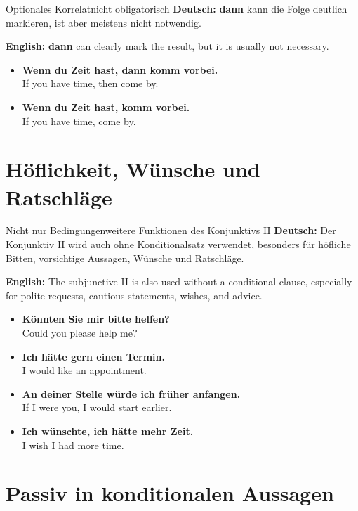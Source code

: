 \documentclass[a4paper,11pt]{article}
\newcommand{\GermanText}[1]{\textbf{Deutsch: }#1\par}
\newcommand{\EnglishText}[1]{{\small\color{SoftGray}\textbf{English: }#1\par}}
\newcommand{\ExampleItem}[2]{\item \textbf{#1}\\{\small\color{SoftGray}#2}}
\begin{document}
        \begin{grammarentry}{Optionales Korrelat}{nicht obligatorisch}
            \GermanText{\textbf{dann} kann die Folge deutlich markieren, ist aber meistens nicht notwendig.}
            \EnglishText{\textbf{dann} can clearly mark the result, but it is usually not necessary.}
        \end{grammarentry}

        \begin{exbox}
            \begin{itemize}
                \ExampleItem{Wenn du Zeit hast, dann komm vorbei.}{If you have time, then come by.}
                \ExampleItem{Wenn du Zeit hast, komm vorbei.}{If you have time, come by.}
            \end{itemize}
        \end{exbox}

    \section{Höflichkeit, Wünsche und Ratschläge}

        \begin{grammarentry}{Nicht nur Bedingungen}{weitere Funktionen des Konjunktivs II}
            \GermanText{Der Konjunktiv II wird auch ohne Konditionalsatz verwendet, besonders für höfliche Bitten, vorsichtige Aussagen, Wünsche und Ratschläge.}
            \EnglishText{The subjunctive II is also used without a conditional clause, especially for polite requests, cautious statements, wishes, and advice.}
        \end{grammarentry}

        \begin{exbox}
            \begin{itemize}
                \ExampleItem{Könnten Sie mir bitte helfen?}{Could you please help me?}
                \ExampleItem{Ich hätte gern einen Termin.}{I would like an appointment.}
                \ExampleItem{An deiner Stelle würde ich früher anfangen.}{If I were you, I would start earlier.}
                \ExampleItem{Ich wünschte, ich hätte mehr Zeit.}{I wish I had more time.}
            \end{itemize}
        \end{exbox}

    \section{Passiv in konditionalen Aussagen}
\end{document}
